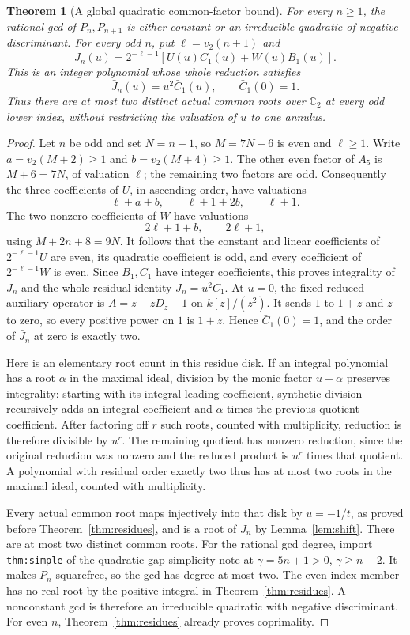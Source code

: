 \documentclass[11pt]{article}
\newtheorem{theorem}[lemma]{Theorem}
\begin{document}
\begin{theorem}[A global quadratic common-factor bound]
\label{thm:global-quadratic-bound}
For every $n\ge1$, the rational gcd of $P_n,P_{n+1}$ is either
constant or an irreducible quadratic of negative discriminant.
For every odd $n$, put $\ell=v_2(n+1)$ and
\[
 J_n(u)=2^{-\ell-1}
       [U(u)C_1(u)+W(u)B_1(u)].
\]
This is an integer polynomial whose whole reduction satisfies
\[
 \bar J_n(u)=u^2\bar C_1(u),\qquad \bar C_1(0)=1.
\]
Thus there are at most two distinct actual common roots over
$\mathbb C_2$ at every odd lower index, without restricting the
valuation of $u$ to one annulus.
\end{theorem}
\begin{proof}
Let $n$ be odd and set $N=n+1$, so $M=7N-6$ is even and $\ell\ge1$.
Write $a=v_2(M+2)\ge1$ and $b=v_2(M+4)\ge1$.
The other even factor of $A_5$ is $M+6=7N$, of valuation $\ell$;
the remaining two factors are odd.
Consequently the three coefficients of $U$, in ascending order,
have valuations
\[
 \ell+a+b,\qquad \ell+1+2b,\qquad\ell+1.
\]
The two nonzero coefficients of $W$ have valuations
\[
 2\ell+1+b,\qquad2\ell+1,
\]
using $M+2n+8=9N$.
It follows that the constant and linear coefficients of
$2^{-\ell-1}U$ are even, its quadratic coefficient is odd, and
every coefficient of $2^{-\ell-1}W$ is even.
Since $B_1,C_1$ have integer coefficients, this proves integrality
of $J_n$ and the whole residual identity
$\bar J_n=u^2\bar C_1$.
At $u=0$, the fixed reduced auxiliary operator is
$A=z-zD_z+1$ on $k[z]/(z^2)$.
It sends $1$ to $1+z$ and $z$ to zero, so every positive power
on $1$ is $1+z$. Hence $\bar C_1(0)=1$, and the order of
$\bar J_n$ at zero is exactly two.

Here is an elementary root count in this residue disk.
If an integral polynomial has a root $\alpha$ in the maximal ideal,
division by the monic factor $u-\alpha$ preserves integrality:
starting with its integral leading coefficient, synthetic division
recursively adds an integral coefficient and $\alpha$ times the
previous quotient coefficient.
After factoring off $r$ such roots, counted with multiplicity,
reduction is therefore divisible by $u^r$.
The remaining quotient has nonzero reduction, since the original
reduction was nonzero and the reduced product is $u^r$ times that
quotient. A polynomial with residual order exactly two thus has
at most two roots in the maximal ideal, counted with multiplicity.

Every actual common root maps injectively into that disk by
$u=-1/t$, as proved before Theorem~\ref{thm:residues}, and is a root
of $J_n$ by Lemma~\ref{lem:shift}.
There are at most two distinct common roots.
For the rational gcd degree, import \texttt{thm:simple} of the
\href{CUBIC_ADJOINT_STABILITY_SFC.tex}{quadratic-gap simplicity note}
at $\gamma=5n+1>0$, $\gamma\ge n-2$.
It makes $P_n$ squarefree, so the gcd has degree at most two.
The even-index member has no real root by the positive integral
in Theorem~\ref{thm:residues}.
A nonconstant gcd is therefore an irreducible quadratic with
negative discriminant.
For even $n$, Theorem~\ref{thm:residues} already proves coprimality.
\end{proof}
\end{document}
